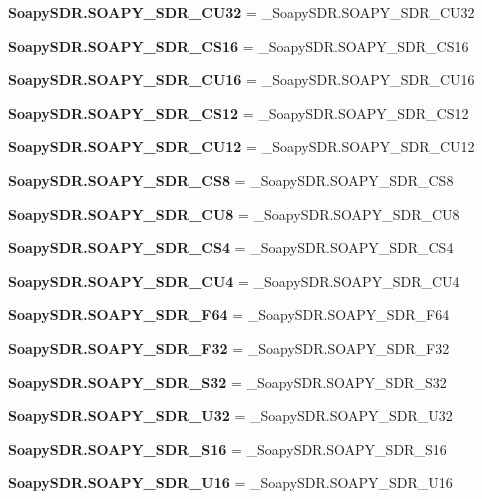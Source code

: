 \begin{DoxyCompactItemize}
\item 
{\bf Soapy\+S\+D\+R.\+S\+O\+A\+P\+Y\+\_\+\+S\+D\+R\+\_\+\+C\+U32} = \+\_\+\+Soapy\+S\+D\+R.\+S\+O\+A\+P\+Y\+\_\+\+S\+D\+R\+\_\+\+C\+U32
\item 
{\bf Soapy\+S\+D\+R.\+S\+O\+A\+P\+Y\+\_\+\+S\+D\+R\+\_\+\+C\+S16} = \+\_\+\+Soapy\+S\+D\+R.\+S\+O\+A\+P\+Y\+\_\+\+S\+D\+R\+\_\+\+C\+S16
\item 
{\bf Soapy\+S\+D\+R.\+S\+O\+A\+P\+Y\+\_\+\+S\+D\+R\+\_\+\+C\+U16} = \+\_\+\+Soapy\+S\+D\+R.\+S\+O\+A\+P\+Y\+\_\+\+S\+D\+R\+\_\+\+C\+U16
\item 
{\bf Soapy\+S\+D\+R.\+S\+O\+A\+P\+Y\+\_\+\+S\+D\+R\+\_\+\+C\+S12} = \+\_\+\+Soapy\+S\+D\+R.\+S\+O\+A\+P\+Y\+\_\+\+S\+D\+R\+\_\+\+C\+S12
\item 
{\bf Soapy\+S\+D\+R.\+S\+O\+A\+P\+Y\+\_\+\+S\+D\+R\+\_\+\+C\+U12} = \+\_\+\+Soapy\+S\+D\+R.\+S\+O\+A\+P\+Y\+\_\+\+S\+D\+R\+\_\+\+C\+U12
\item 
{\bf Soapy\+S\+D\+R.\+S\+O\+A\+P\+Y\+\_\+\+S\+D\+R\+\_\+\+C\+S8} = \+\_\+\+Soapy\+S\+D\+R.\+S\+O\+A\+P\+Y\+\_\+\+S\+D\+R\+\_\+\+C\+S8
\item 
{\bf Soapy\+S\+D\+R.\+S\+O\+A\+P\+Y\+\_\+\+S\+D\+R\+\_\+\+C\+U8} = \+\_\+\+Soapy\+S\+D\+R.\+S\+O\+A\+P\+Y\+\_\+\+S\+D\+R\+\_\+\+C\+U8
\item 
{\bf Soapy\+S\+D\+R.\+S\+O\+A\+P\+Y\+\_\+\+S\+D\+R\+\_\+\+C\+S4} = \+\_\+\+Soapy\+S\+D\+R.\+S\+O\+A\+P\+Y\+\_\+\+S\+D\+R\+\_\+\+C\+S4
\item 
{\bf Soapy\+S\+D\+R.\+S\+O\+A\+P\+Y\+\_\+\+S\+D\+R\+\_\+\+C\+U4} = \+\_\+\+Soapy\+S\+D\+R.\+S\+O\+A\+P\+Y\+\_\+\+S\+D\+R\+\_\+\+C\+U4
\item 
{\bf Soapy\+S\+D\+R.\+S\+O\+A\+P\+Y\+\_\+\+S\+D\+R\+\_\+\+F64} = \+\_\+\+Soapy\+S\+D\+R.\+S\+O\+A\+P\+Y\+\_\+\+S\+D\+R\+\_\+\+F64
\item 
{\bf Soapy\+S\+D\+R.\+S\+O\+A\+P\+Y\+\_\+\+S\+D\+R\+\_\+\+F32} = \+\_\+\+Soapy\+S\+D\+R.\+S\+O\+A\+P\+Y\+\_\+\+S\+D\+R\+\_\+\+F32
\item 
{\bf Soapy\+S\+D\+R.\+S\+O\+A\+P\+Y\+\_\+\+S\+D\+R\+\_\+\+S32} = \+\_\+\+Soapy\+S\+D\+R.\+S\+O\+A\+P\+Y\+\_\+\+S\+D\+R\+\_\+\+S32
\item 
{\bf Soapy\+S\+D\+R.\+S\+O\+A\+P\+Y\+\_\+\+S\+D\+R\+\_\+\+U32} = \+\_\+\+Soapy\+S\+D\+R.\+S\+O\+A\+P\+Y\+\_\+\+S\+D\+R\+\_\+\+U32
\item 
{\bf Soapy\+S\+D\+R.\+S\+O\+A\+P\+Y\+\_\+\+S\+D\+R\+\_\+\+S16} = \+\_\+\+Soapy\+S\+D\+R.\+S\+O\+A\+P\+Y\+\_\+\+S\+D\+R\+\_\+\+S16
\item 
{\bf Soapy\+S\+D\+R.\+S\+O\+A\+P\+Y\+\_\+\+S\+D\+R\+\_\+\+U16} = \+\_\+\+Soapy\+S\+D\+R.\+S\+O\+A\+P\+Y\+\_\+\+S\+D\+R\+\_\+\+U16

\end{DoxyCompactItemize}
